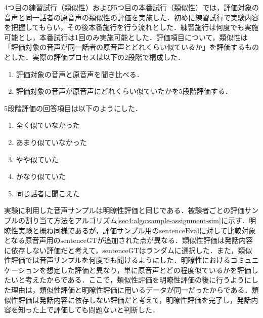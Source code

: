 4つ目の練習試行（類似性）および5つ目の本番試行（類似性）では，評価対象の音声と同一話者の原音声の類似性の評価を実施した．初めに練習試行で実験内容を把握してもらい，その後本番施行を行う流れとした．練習施行は何度でも実施可能とし，本番試行は1回のみ実施可能とした．評価項目について，類似性は「評価対象の音声が同一話者の原音声とどれくらい似ているか」を評価するものとした．実際の評価プロセスは以下の2段階で構成した．
\begin{enumerate}
    \item 評価対象の音声と原音声を聞き比べる．
    \item 評価対象の音声が原音声にどれくらい似ていたかを5段階評価する．
\end{enumerate}
5段階評価の回答項目は以下のようにした．
\begin{enumerate}
    \item 全く似ていなかった
    \item あまり似ていなかった
    \item やや似ていた
    \item かなり似ていた
    \item 同じ話者に聞こえた
\end{enumerate}
実験に利用した音声サンプルは明瞭性評価と同じである．被験者ごとの評価サンプルの割り当て方法をアルゴリズム\ref{sec4:algo:sample-assignment-sim}に示す．明瞭性実験と概ね同様であるが，評価サンプル用の$\text{sentenceEval}$に対して比較対象となる原音声用の$\text{sentenceGT}$が追加された点が異なる．類似性評価は発話内容に依存しない評価だと考えて，$\text{sentenceGT}$はランダムに選択した．また，類似性評価では音声サンプルを何度でも聞けるようにした．明瞭性におけるコミュニケーションを想定した評価と異なり，単に原音声とどの程度似ているかを評価したいと考えたからである．ここで，類似性評価を明瞭性評価の後に行うようにした理由は，類似性評価と明瞭性評価に用いるデータが同一だったからである．類似性評価は発話内容に依存しない評価だと考えて，明瞭性評価を完了し，発話内容を知った上で評価しても問題ないと判断した．
